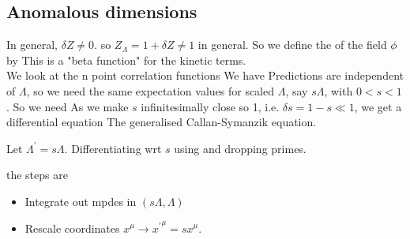 \documentclass{article}
\begin{document}
\subsection{Anomalous dimensions}
In general, $\delta Z \neq 0$. so $Z_\Lambda = 1 + \delta Z \neq 1$ in general. So we define the  of the field $\phi$ by 
This is a "beta function" for the kinetic terms. \\
We look at the n point correlation functions 
We have 
Predictions are independent of $\Lambda$, so we need the same expectation values for scaled $\Lambda$, say $s\Lambda$, with $0<s<1$. So we need 
As we make $s$ infinitesimally close so 1, i.e. $\delta s = 1-s \ll 1$, we get a differential equation 
The generalised Callan-Symanzik equation. 

\begin{example}
Let $\Lambda^\prime = s\Lambda$. Differentiating wrt $s$ 
using 
and dropping primes. 
\end{example}

the steps are 
\begin{itemize}
    \item Integrate out mpdes in $(s\Lambda,\Lambda)$
    \item Rescale coordinates $x^\mu \to {x^\prime}^\mu = sx^\mu$. 
\end{itemize}
\end{document}
